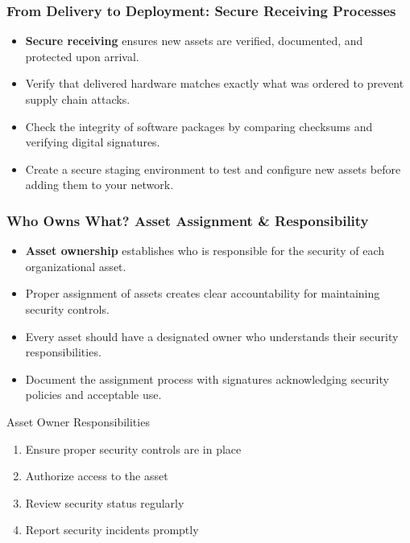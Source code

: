 \documentclass{beamer}
\begin{document}
\begin{frame}
\frametitle{From Delivery to Deployment: Secure Receiving Processes}
\begin{itemize}
\item \textbf{Secure receiving} ensures new assets are verified, documented, and protected upon arrival.
\item Verify that delivered hardware matches exactly what was ordered to prevent supply chain attacks.
\item Check the integrity of software packages by comparing checksums and verifying digital signatures.
\item Create a secure staging environment to test and configure new assets before adding them to your network.
\end{itemize}

\begin{center}
\end{center}
\end{frame}

\begin{frame}
\frametitle{Who Owns What? Asset Assignment \& Responsibility}
\begin{itemize}
\item \textbf{Asset ownership} establishes who is responsible for the security of each organizational asset.
\item Proper assignment of assets creates clear accountability for maintaining security controls.
\item Every asset should have a designated owner who understands their security responsibilities.
\item Document the assignment process with signatures acknowledging security policies and acceptable use.
\end{itemize}

\begin{block}{Asset Owner Responsibilities}
\begin{enumerate}
\item Ensure proper security controls are in place
\item Authorize access to the asset
\item Review security status regularly
\item Report security incidents promptly
\end{enumerate}
\end{block}
\end{frame}
\end{document}
